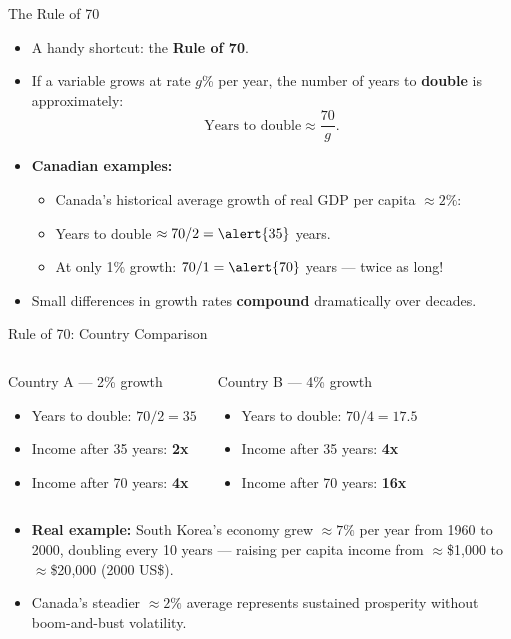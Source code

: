 \documentclass[aspectratio=169]{beamer}
\begin{document}
\begin{frame}{The Rule of 70}
\transfade
\begin{itemize}[<+->]
  \item A handy shortcut: the \textbf{Rule of 70}.
  \item If a variable grows at rate $g$\% per year, the number of years to \textbf{double} is approximately:
  \[
    \text{Years to double} \approx \frac{70}{g}.
  \]
  \item \textbf{Canadian examples:}
  \begin{itemize}[<+->]
    \item Canada's historical average growth of real GDP per capita $\approx 2\%$:
    \item Years to double $\approx 70 / 2 = \alert{35}$ years.
    \item At only 1\% growth: $70 / 1 = \alert{70}$ years --- twice as long!
  \end{itemize}
  \item Small differences in growth rates \textbf{compound} dramatically over decades.
\end{itemize}
\end{frame}

\begin{frame}{Rule of 70: Country Comparison}
\transfade
\begin{columns}
\begin{block}{Country A --- 2\% growth}
\begin{itemize}
  \item Years to double: $70/2 = 35$
  \item Income after 35 years: \textbf{2x}
  \item Income after 70 years: \textbf{4x}
\end{itemize}
\end{block}
\begin{block}{Country B --- 4\% growth}
\begin{itemize}
  \item Years to double: $70/4 = 17.5$
  \item Income after 35 years: \textbf{4x}
  \item Income after 70 years: \textbf{16x}
\end{itemize}
\end{block}
\end{columns}
\vspace{0.5em}
\begin{itemize}[<+->]
  \item \textbf{Real example:} South Korea's economy grew $\approx 7\%$ per year from 1960 to 2000, doubling every 10 years --- raising per capita income from $\approx$\$1{,}000 to $\approx$\$20{,}000 (2000 US\$).
  \item Canada's steadier $\approx 2\%$ average represents \textcolor{leafgreen}{sustained prosperity without boom-and-bust volatility}.
\end{itemize}
\end{frame}
\end{document}
